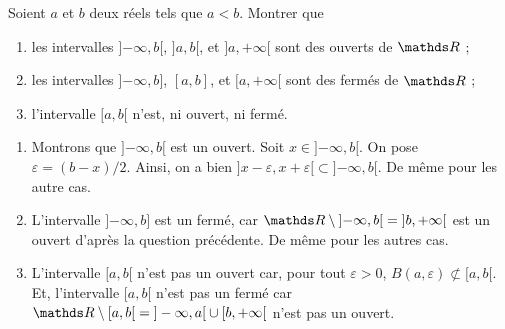 \begin{exo}
	\begin{slshape}
		Soient $a$ et $b$ deux réels tels que $a < b$. Montrer que
		\begin{enumerate}
			\item les intervalles $]{-\infty}, b[$, $]a,b[$, et $]a,{+\infty}[$ sont des ouverts de $\R$ ;
			\item les intervalles $]{-\infty}, b]$, $[a,b]$, et $[a,{+\infty}[$ sont des fermés de $\R$ ;
			\item l'intervalle $[a,b[$ n'est, ni ouvert, ni fermé.
		\end{enumerate}
	\end{slshape}

	\begin{enumerate}
		\item Montrons que ${]{-\infty}, {b}[}$ est un ouvert. Soit $x \in {]{-\infty}, {b}[}$.
			On pose $\varepsilon = (b - x) / 2$. Ainsi, on a bien ${]x-\varepsilon,x+\varepsilon[} \subset {]{-\infty},b[}$.
			De même pour les autre cas.
		\item L'intervalle $]{-\infty},b]$\/ est un fermé, car $\R \setminus {]{-\infty},b[} = {]b,+\infty[}$\/ est un ouvert d'après la question précédente. De même pour les autres cas.
		\item L'intervalle $[a,b[$\/ n'est pas un ouvert car, pour tout $\varepsilon > 0$, $B(a, \varepsilon) \not\subset [a,b[$.
			Et, l'intervalle $[a,b[$ n'est pas un fermé car $\R \setminus {[a,b[} = {]-\infty, a[} \cup [b, +\infty[$\/ n'est pas un ouvert.
	\end{enumerate}
\end{exo}



